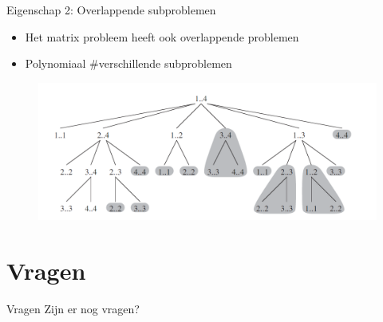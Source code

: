 \documentclass
   [kulak] %
   {kulakbeamer}
\begin{document}
\begin{frame}{Eigenschap 2: Overlappende subproblemen}
\begin{itemize}
    \item<1-> Het matrix probleem heeft ook overlappende problemen
    \item<2-> Polynomiaal \#verschillende subproblemen
\end{itemize}
\begin{figure}
    \centering
    \includegraphics[width=0.8\linewidth]{recursivematrix.png}
\end{figure}
\end{frame}

\section*{Vragen}
\begin{frame}{Vragen}
    Zijn er nog vragen?
\end{frame}
\end{document}
